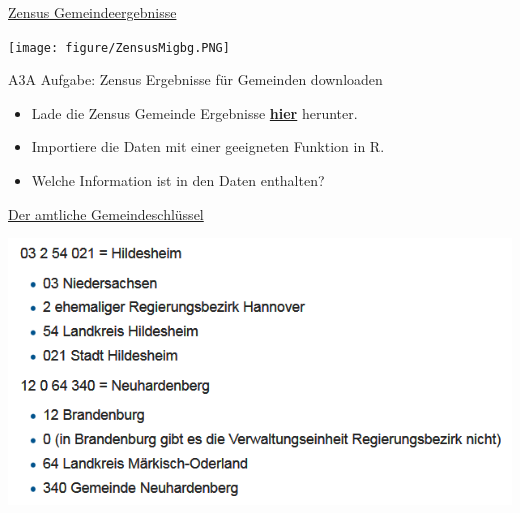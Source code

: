 \documentclass[ignorenonframetext,]{beamer}
\providecommand{\tightlist}{%
  \setlength{\itemsep}{0pt}\setlength{\parskip}{0pt}}
\begin{document}
\begin{frame}{\href{https://www.destatis.de/DE/Methoden/Zensus_/Zensus.html}{Zensus
Gemeindeergebnisse}}
\protect\hypertarget{zensus-gemeindeergebnisse}{}

\texttt{[image: figure/ZensusMigbg.PNG]}

\end{frame}

\begin{frame}{A3A Aufgabe: Zensus Ergebnisse für Gemeinden downloaden}
\protect\hypertarget{a3a-aufgabe-zensus-ergebnisse-fur-gemeinden-downloaden}{}

\begin{itemize}
\tightlist
\item
  Lade die Zensus Gemeinde Ergebnisse
  \href{https://www.zensus2011.de/SharedDocs/Aktuelles/Ergebnisse/DemografischeGrunddaten.html}{\textbf{hier}}
  herunter.
\item
  Importiere die Daten mit einer geeigneten Funktion in R.
\item
  Welche Information ist in den Daten enthalten?
\end{itemize}

\end{frame}

\begin{frame}{\href{https://de.wikipedia.org/wiki/Amtlicher_Gemeindeschl\%C3\%BCssel}{Der
amtliche Gemeindeschlüssel}}
\protect\hypertarget{der-amtliche-gemeindeschlussel}{}

\includegraphics{figure/ags_beispiele.PNG}

\end{frame}
\end{document}
